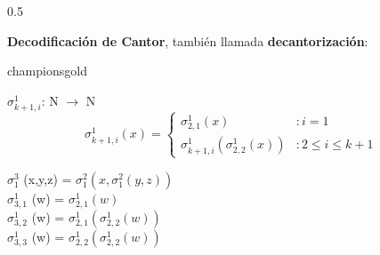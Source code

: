 \documentclass[xcolor=table]{beamer}
\begin{document}
\begin{frame}[fragile]
\begin{columns}
    \begin{column}{0.5\textwidth}

    

    \textbf{Decodificación de Cantor}, también llamada \textbf{decantorización}:

         \begin{colorblock}[black]{championsgold}{}\scriptsize

         $\sigma^1_{k+1,i}$: N $\rightarrow$ N\\
        \[\sigma^1_{k+1,i}(x) = \left\{ \begin{array}{lr} \sigma^1_{2,1}(x) & : i=1\\ \sigma^1_{k+1,i}(\sigma^1_{2,2}(x)) & : 2 \leq i \leq k+1   \end{array} \right. \]


        \end{colorblock}

$\sigma^3_{1}$ (x,y,z) =  $\sigma^2_{1} (x, \sigma^2_{1}( y,z) )$\\
\vspace{0.3cm}
$\sigma^1_{3,1}$ (w) =  $\sigma^1_{2,1} (w)$\\
$\sigma^1_{3,2}$ (w) =  $\sigma^1_{2,1} (\sigma^1_{2,2}(w))$\\
$\sigma^1_{3,3}$ (w) =  $\sigma^1_{2,2} (\sigma^1_{2,2}(w))$
    \end{column}
    
\end{columns}

\end{frame}
\end{document}
